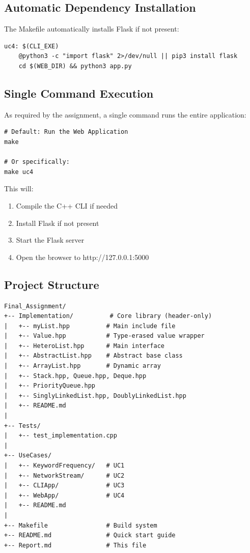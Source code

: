 \documentclass[11pt,a4paper]{article}
\begin{document}
\subsection{Automatic Dependency Installation}

The Makefile automatically installs Flask if not present:

\begin{verbatim}
uc4: $(CLI_EXE)
    @python3 -c "import flask" 2>/dev/null || pip3 install flask
    cd $(WEB_DIR) && python3 app.py
\end{verbatim}

\subsection{Single Command Execution}

As required by the assignment, a single command runs the entire application:

\begin{verbatim}
# Default: Run the Web Application
make

# Or specifically:
make uc4
\end{verbatim}

This will:
\begin{enumerate}
    \item Compile the C++ CLI if needed
    \item Install Flask if not present
    \item Start the Flask server
    \item Open the browser to http://127.0.0.1:5000
\end{enumerate}

\subsection{Project Structure}

\begin{verbatim}
Final_Assignment/
+-- Implementation/          # Core library (header-only)
|   +-- myList.hpp          # Main include file
|   +-- Value.hpp           # Type-erased value wrapper
|   +-- HeteroList.hpp      # Main interface
|   +-- AbstractList.hpp    # Abstract base class
|   +-- ArrayList.hpp       # Dynamic array
|   +-- Stack.hpp, Queue.hpp, Deque.hpp
|   +-- PriorityQueue.hpp
|   +-- SinglyLinkedList.hpp, DoublyLinkedList.hpp
|   +-- README.md
|
+-- Tests/
|   +-- test_implementation.cpp
|
+-- UseCases/
|   +-- KeywordFrequency/   # UC1
|   +-- NetworkStream/      # UC2
|   +-- CLIApp/             # UC3
|   +-- WebApp/             # UC4
|   +-- README.md
|
+-- Makefile                # Build system
+-- README.md               # Quick start guide
+-- Report.md               # This file
\end{verbatim}
\end{document}
